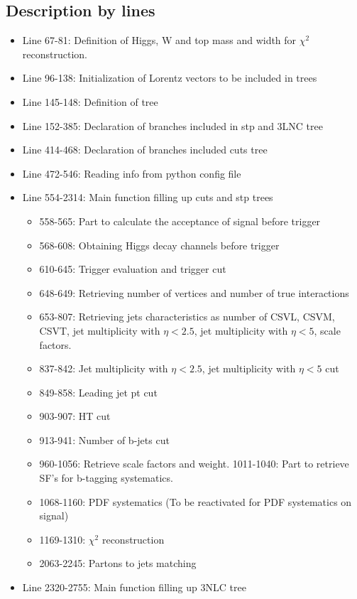 \documentclass[11pt,a4paper]{article}
\begin{document}
\subsection{Description by lines}
\begin{itemize}
\item Line 67-81: Definition of Higgs, W and top mass and width for $\chi^{2}$ reconstruction.
\item Line 96-138: Initialization of Lorentz vectors to be included in trees
\item Line 145-148: Definition of tree
\item Line 152-385: Declaration of branches included in stp and 3LNC tree
\item Line 414-468: Declaration of branches included cuts tree
\item Line 472-546: Reading info from python config file
\item Line 554-2314: Main function filling up cuts and stp trees
  \begin{itemize}
  \item 558-565: Part to calculate the acceptance of signal before trigger
  \item 568-608: Obtaining Higgs decay channels before trigger
  \item 610-645: Trigger evaluation and trigger cut
  \item 648-649: Retrieving number of vertices and number of true interactions
  \item 653-807: Retrieving jets characteristics as number of CSVL, CSVM, CSVT, jet multiplicity with $\eta<2.5$, jet multiplicity with $\eta<5$, scale factors.
  \item 837-842: Jet multiplicity with $\eta<2.5$, jet multiplicity with $\eta<5$ cut
  \item 849-858: Leading jet pt cut
  \item 903-907: HT cut
  \item 913-941: Number of b-jets cut
  \item 960-1056: Retrieve scale factors and weight. 1011-1040: Part to retrieve SF's for b-tagging systematics.
  \item 1068-1160: PDF systematics (To be reactivated for PDF systematics on signal)
  \item 1169-1310: $\chi^{2}$ reconstruction
  \item 2063-2245: Partons to jets matching
  \end{itemize}
\item Line 2320-2755: Main function filling up 3NLC tree

\end{itemize}
\end{document}
